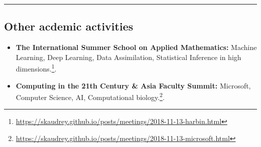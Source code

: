 \documentclass[10pt,letterpaper]{article}
\begin{document}
\hrule
\vspace{-0.4em}
\subsection*{Other acdemic activities}

\begin{itemize}
	\parskip=0.1em
	
	\item \textbf{The International Summer School on Applied Mathematics:} Machine Learning, Deep Learning, Data Assimilation, Statistical Inference in high dimensions.\footnote{\url{https://skaudrey.github.io/posts/meetings/2018-11-13-harbin.html}}.
	
	\item \textbf{Computing in the 21th Century \& Asia Faculty Summit:} Microsoft, Computer Science, AI, Computational biology.\footnote{\url{https://skaudrey.github.io/posts/meetings/2018-11-13-microsoft.html}}.

\end{itemize}
\end{document}
